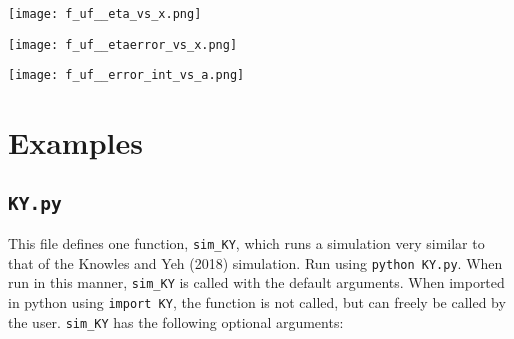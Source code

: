 \documentclass[10pt,a4paper]{article}
\begin{document}
\texttt{[image: f\_uf\_\_eta\_vs\_x.png]}

\texttt{[image: f\_uf\_\_etaerror\_vs\_x.png]}

\texttt{[image: f\_uf\_\_error\_int\_vs\_a.png]}








\pagebreak

\section{Examples}

\subsection{\texttt{KY.py}}

This file defines one function, \texttt{sim\_KY}, which runs a simulation very similar to that of the Knowles and Yeh (2018) simulation.
Run using \texttt{python KY.py}. When run in this manner, \texttt{sim\_KY} is called with the default arguments. When imported in python using \texttt{import KY}, the function is not called, but can freely be called by the user. \texttt{sim\_KY} has the following optional arguments:
\end{document}

